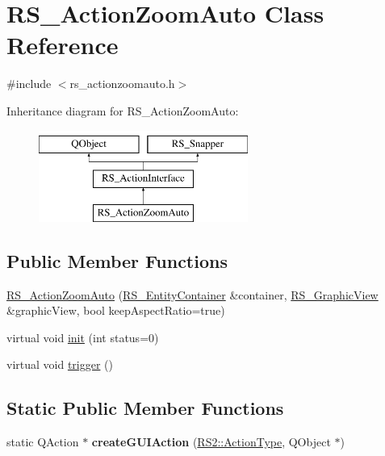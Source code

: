 \hypertarget{classRS__ActionZoomAuto}{\section{R\-S\-\_\-\-Action\-Zoom\-Auto Class Reference}
\label{classRS__ActionZoomAuto}
}


{\ttfamily \#include $<$rs\-\_\-actionzoomauto.\-h$>$}

Inheritance diagram for R\-S\-\_\-\-Action\-Zoom\-Auto\-:\begin{figure}[H]
\begin{center}
\leavevmode
\includegraphics[height=3.000000cm]{classRS__ActionZoomAuto}
\end{center}
\end{figure}
\subsection*{Public Member Functions}
\begin{DoxyCompactItemize}
\item 
\hyperlink{classRS__ActionZoomAuto_a483fa4c296e0790ea44f8e062dc8f642}{R\-S\-\_\-\-Action\-Zoom\-Auto} (\hyperlink{classRS__EntityContainer}{R\-S\-\_\-\-Entity\-Container} \&container, \hyperlink{classRS__GraphicView}{R\-S\-\_\-\-Graphic\-View} \&graphic\-View, bool keep\-Aspect\-Ratio=true)
\item 
virtual void \hyperlink{classRS__ActionZoomAuto_a926f6d98c948d9ffc10a1223db16a7fa}{init} (int status=0)
\item 
virtual void \hyperlink{classRS__ActionZoomAuto_a2fb15c41ce52eb6adb6522e2e53db66a}{trigger} ()
\end{DoxyCompactItemize}
\subsection*{Static Public Member Functions}
\begin{DoxyCompactItemize}
\item 
\hypertarget{classRS__ActionZoomAuto_aa6d29f0c53274b5e5a2d9a4f153f7cf2}{static Q\-Action $\ast$ {\bfseries create\-G\-U\-I\-Action} (\hyperlink{classRS2_afe3523e0bc41fd637b892321cfc4b9d7}{R\-S2\-::\-Action\-Type}, Q\-Object $\ast$)}\label{classRS__ActionZoomAuto_aa6d29f0c53274b5e5a2d9a4f153f7cf2}

\end{DoxyCompactItemize}
